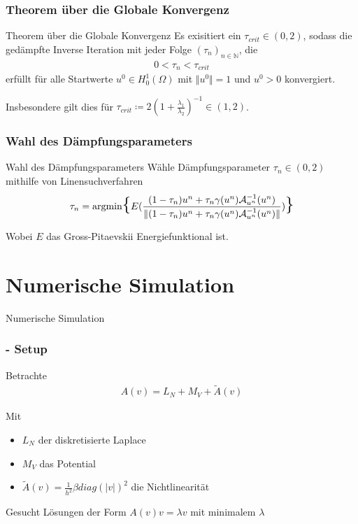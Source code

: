 \documentclass{beamer}
\newcommand{\sectionstart}[1]{
    \section{#1}
    \begin{frame}
        \centering
        \huge{#1}
    \end{frame}
}
\newcommand{\Honez}{\ensuremath{{H^1_0(\Omega)}}}
\newcommand{\mA}{\ensuremath{\mathcal{A}}}
\begin{document}
    \begin{frame}
        \frametitle{Theorem über die Globale Konvergenz}
        \begin{block}{Theorem über die Globale Konvergenz}
            Es exisitiert ein $\tau_{crit} \in (0,2)$, sodass die gedämpfte Inverse
            Iteration mit jeder Folge $(\tau_n)_{n \in \mathbb{N}}$, die
            \begin{align*}
                0 < \tau_n < \tau_{crit}
            \end{align*}
            erfüllt für alle Startwerte $u^0 \in \Honez$ mit $\Vert u^0 \Vert = 1$
            und $u^0 > 0$ konvergiert.


        \end{block}

        Insbesondere gilt dies für $\tau_{crit} \coloneq 2(1 + \frac{\lambda_1}{\lambda_2})^{-1} \in (1, 2)$.
    \end{frame}

    \begin{frame}
        \frametitle{Wahl des Dämpfungsparameters}

        \begin{block}{Wahl des Dämpfungsparameters}
            Wähle Dämpfungsparameter $\tau_n \in (0,2)$ mithilfe von Linensuchverfahren
            \begin{align*}
                \tau_n = \mathrm{arg min}
                    \mathlarger{\mathlarger{\mathlarger{\{}}}
                    E(\frac{(1 - \tau_n)u^n + \tau_n\gamma(u^n)\mA_{u^n}^{-1}(u^n)}
                    {\Vert(1 - \tau_n)u^n + \tau_n\gamma(u^n)\mA_{u^n}^{-1}(u^n)\Vert})
                    \mathlarger{\mathlarger{\mathlarger{\}}}}
            \end{align*}

            Wobei $E$ das Gross-Pitaevskii Energiefunktional ist.
        \end{block}
    \end{frame}


    \sectionstart{Numerische Simulation}

    \begin{frame}
        \frametitle{{\insertsection} - Setup}

        Betrachte
        \begin{align*}
            A(v) = L_N + M_V + \tilde{A}(v)
        \end{align*}

        \pause
        \bigskip

        Mit
        \begin{itemize}
            \item $L_N$ der diskretisierte Laplace
                \pause
            \item $M_V$ das Potential
                \pause
            \item $\tilde{A}(v) = \frac{1}{h^2}\beta diag(\vert v \vert)^2$ die Nichtlinearität
        \end{itemize}

        \pause
        \bigskip

        Gesucht Lösungen der Form $A(v)v = \lambda v$ mit minimalem $\lambda$
    \end{frame}
\end{document}
